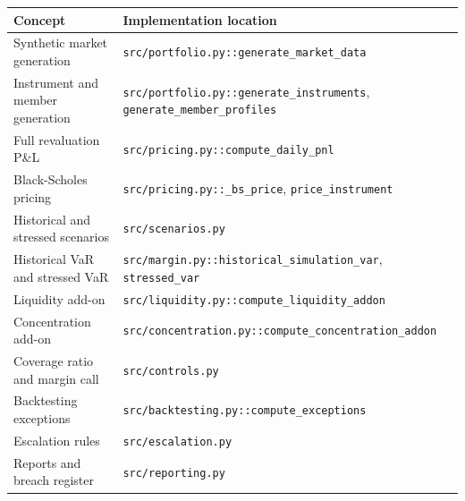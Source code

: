 \documentclass[11pt]{article}
\begin{document}
\begin{center}
\begin{tabular}{>{\raggedright\arraybackslash}p{} >{\raggedright\arraybackslash}p{}}
\toprule
Concept & Implementation location \\
\midrule
Synthetic market generation & \texttt{src/portfolio.py::generate\_market\_data} \\
Instrument and member generation & \texttt{src/portfolio.py::generate\_instruments}, \texttt{generate\_member\_profiles} \\
Full revaluation P\&L & \texttt{src/pricing.py::compute\_daily\_pnl} \\
Black-Scholes pricing & \texttt{src/pricing.py::\_bs\_price}, \texttt{price\_instrument} \\
Historical and stressed scenarios & \texttt{src/scenarios.py} \\
Historical VaR and stressed VaR & \texttt{src/margin.py::historical\_simulation\_var}, \texttt{stressed\_var} \\
Liquidity add-on & \texttt{src/liquidity.py::compute\_liquidity\_addon} \\
Concentration add-on & \texttt{src/concentration.py::compute\_concentration\_addon} \\
Coverage ratio and margin call & \texttt{src/controls.py} \\
Backtesting exceptions & \texttt{src/backtesting.py::compute\_exceptions} \\
Escalation rules & \texttt{src/escalation.py} \\
Reports and breach register & \texttt{src/reporting.py} \\
\bottomrule
\end{tabular}
\end{center}
\end{document}
